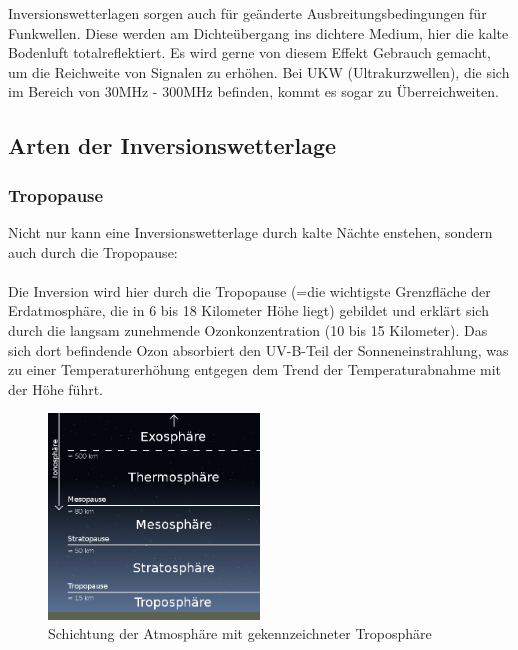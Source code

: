 \documentclass[11pt, a4paper]{article}
\begin{document}
Inversionswetterlagen sorgen auch für geänderte Ausbreitungsbedingungen für Funkwellen. Diese werden am Dichteübergang ins dichtere Medium, hier die kalte Bodenluft totalreflektiert. Es wird gerne von diesem Effekt Gebrauch gemacht, um die Reichweite von Signalen zu erhöhen. Bei UKW (Ultrakurzwellen), die sich im Bereich von 30MHz - 300MHz befinden, kommt es sogar zu Überreichweiten. \\

\newpage
\subsection{Arten der Inversionswetterlage}
\subsubsection{Tropopause}
Nicht nur kann eine Inversionswetterlage durch kalte Nächte enstehen, sondern auch durch die Tropopause: \\ \\
Die Inversion wird hier durch die Tropopause (=die wichtigste Grenzfläche der Erdatmosphäre, die in 6 bis 18 Kilometer Höhe liegt)\cite{tropopause} gebildet und erklärt sich durch die langsam zunehmende Ozonkonzentration (10 bis 15 Kilometer). Das sich dort befindende Ozon absorbiert den UV-B-Teil der Sonneneinstrahlung, was zu einer Temperaturerhöhung entgegen dem Trend der Temperaturabnahme mit der Höhe führt.

\begin{figure}[h!]
	\centering
	\includegraphics[width=0.5\textwidth]{images/tropo-image}
	\caption{Schichtung der Atmosphäre mit gekennzeichneter Troposphäre  \cite{tropo-image}}
\end{figure}
\end{document}
